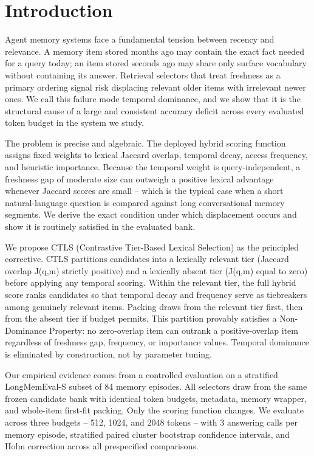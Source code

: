 \section{Introduction}

\label{sec:introduction}

Agent memory systems face a fundamental tension between recency and relevance. A memory item stored months ago may contain the exact fact needed for a query today; an item stored seconds ago may share only surface vocabulary without containing its answer. Retrieval selectors that treat freshness as a primary ordering signal risk displacing relevant older items with irrelevant newer ones. We call this failure mode temporal dominance, and we show that it is the structural cause of a large and consistent accuracy deficit across every evaluated token budget in the system we study.

The problem is precise and algebraic. The deployed hybrid scoring function assigns fixed weights to lexical Jaccard overlap, temporal decay, access frequency, and heuristic importance. Because the temporal weight is query-independent, a freshness gap of moderate size can outweigh a positive lexical advantage whenever Jaccard scores are small -- which is the typical case when a short natural-language question is compared against long conversational memory segments. We derive the exact condition under which displacement occurs and show it is routinely satisfied in the evaluated bank.

We propose CTLS (Contrastive Tier-Based Lexical Selection) as the principled corrective. CTLS partitions candidates into a lexically relevant tier (Jaccard overlap J(q,m) strictly positive) and a lexically absent tier (J(q,m) equal to zero) before applying any temporal scoring. Within the relevant tier, the full hybrid score ranks candidates so that temporal decay and frequency serve as tiebreakers among genuinely relevant items. Packing draws from the relevant tier first, then from the absent tier if budget permits. This partition provably satisfies a Non-Dominance Property: no zero-overlap item can outrank a positive-overlap item regardless of freshness gap, frequency, or importance values. Temporal dominance is eliminated by construction, not by parameter tuning.

Our empirical evidence comes from a controlled evaluation on a stratified LongMemEval-S subset of 84 memory episodes. All selectors draw from the same frozen candidate bank with identical token budgets, metadata, memory wrapper, and whole-item first-fit packing. Only the scoring function changes. We evaluate across three budgets -- 512, 1024, and 2048 tokens -- with 3 answering calls per memory episode, stratified paired cluster bootstrap confidence intervals, and Holm correction across all prespecified comparisons.

